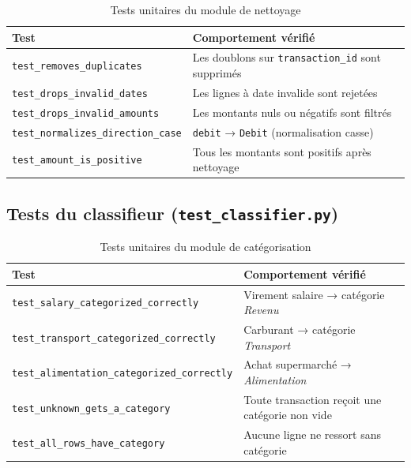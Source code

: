 \documentclass[12pt,a4paper]{report}
\begin{document}
\begin{table}[H]
  \centering
  \caption{Tests unitaires du module de nettoyage}
  \label{tab:tests-cleaner}
  \renewcommand{\arraystretch}{1.3}
  \begin{tabularx}{\textwidth}{lX}
    \toprule
    Test & Comportement vérifié \\
    \midrule
    \texttt{test\_removes\_duplicates} & Les doublons sur \texttt{transaction\_id} sont supprimés \\
    \texttt{test\_drops\_invalid\_dates} & Les lignes à date invalide sont rejetées \\
    \texttt{test\_drops\_invalid\_amounts} & Les montants nuls ou négatifs sont filtrés \\
    \texttt{test\_normalizes\_direction\_case} & \texttt{debit} → \texttt{Debit} (normalisation casse) \\
    \texttt{test\_amount\_is\_positive} & Tous les montants sont positifs après nettoyage \\
    \bottomrule
  \end{tabularx}
\end{table}

\subsection{Tests du classifieur (\texttt{test\_classifier.py})}

\begin{table}[H]
  \centering
  \caption{Tests unitaires du module de catégorisation}
  \label{tab:tests-classifier}
  \renewcommand{\arraystretch}{1.3}
  \begin{tabularx}{\textwidth}{lX}
    \toprule
    Test & Comportement vérifié \\
    \midrule
    \texttt{test\_salary\_categorized\_correctly} & Virement salaire → catégorie \emph{Revenu} \\
    \texttt{test\_transport\_categorized\_correctly} & Carburant → catégorie \emph{Transport} \\
    \texttt{test\_alimentation\_categorized\_correctly} & Achat supermarché → \emph{Alimentation} \\
    \texttt{test\_unknown\_gets\_a\_category} & Toute transaction reçoit une catégorie non vide \\
    \texttt{test\_all\_rows\_have\_category} & Aucune ligne ne ressort sans catégorie \\
    \bottomrule
  \end{tabularx}
\end{table}
\end{document}
